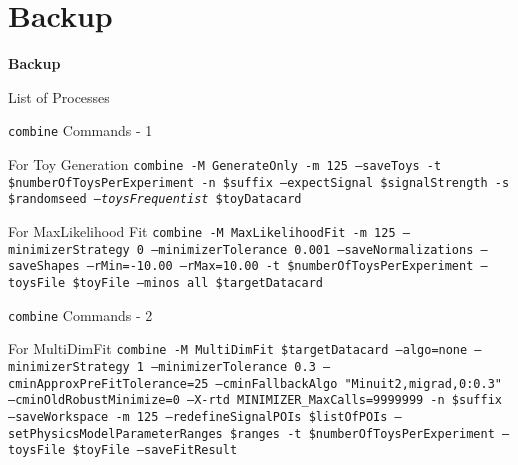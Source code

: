 \section*{Backup}
\begin{frame}
	\begin{center}
		\textbf{\Huge Backup}
	\end{center}
\end{frame}

\begin{frame}{List of Processes}


\end{frame}


\begin{frame}{\texttt{combine} Commands - 1}
\begin{block}{For Toy Generation}
\texttt{combine -M GenerateOnly -m 125 --saveToys -t \$numberOfToysPerExperiment -n \$suffix --expectSignal \$signalStrength -s \$randomseed \emph{--toysFrequentist} \$toyDatacard}
\end{block}
\begin{block}{For MaxLikelihood Fit}
\texttt{combine -M MaxLikelihoodFit -m 125 --minimizerStrategy 0 --minimizerTolerance 0.001 --saveNormalizations --saveShapes --rMin=-10.00 --rMax=10.00 -t \$numberOfToysPerExperiment --toysFile \$toyFile --minos all \$targetDatacard}
\end{block}

\end{frame}

\begin{frame}{\texttt{combine} Commands - 2}
\begin{block}{For MultiDimFit}
\texttt{combine -M MultiDimFit \$targetDatacard --algo=none --minimizerStrategy 1 --minimizerTolerance 0.3 --cminApproxPreFitTolerance=25 --cminFallbackAlgo "Minuit2,migrad,0:0.3" --cminOldRobustMinimize=0 --X-rtd MINIMIZER\_MaxCalls=9999999 -n \$suffix --saveWorkspace -m 125 --redefineSignalPOIs \$listOfPOIs --setPhysicsModelParameterRanges \$ranges -t \$numberOfToysPerExperiment --toysFile \$toyFile --saveFitResult}
\end{block}

\end{frame}

